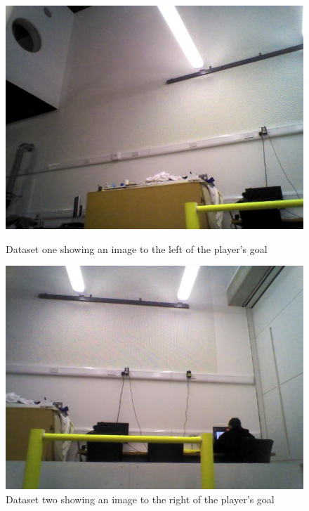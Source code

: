 \documentclass{article}
\begin{document}
\begin{figure}[h!]
\begin{minipage}[b]{0.5\linewidth}
\includegraphics[scale=0.5]{../Drawings/datasetImages/mgLeft.jpg}
\caption{Dataset one showing an image to the left of the player's goal}
\label{fig:dataset1}
\end{minipage}
\hspace{0.5cm}
\begin{minipage}[b]{0.5\linewidth}
\includegraphics[scale=0.5]{../Drawings/datasetImages/mgRight.jpg}
\caption{Dataset two showing an image to the right of the player's goal}
\label{fig:dataset2}
\end{minipage}
\hspace{0.5cm}

\end{figure}
\end{document}
